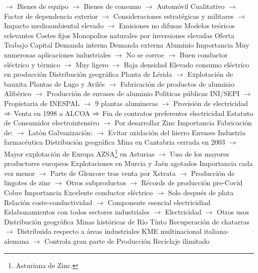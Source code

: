 \documentclass{nuevotema}
\begin{document}
\begin{esquemal}
				\4[] $\to$ Bienes de equipo
				\4[] $\to$ Bienes de consumo
				\4[] $\to$ Automóvil
				\4[] Cualitativo
				\4[] $\to$ Factor de dependencia exterior
				\4[] $\to$ Consideraciones estratégicas y militares
				\4[] $\to$ Impacto medioambiental elevado
				\4[] $\to$ Emisiones no difusas
				\4 Modelos teóricos relevantes
				\4[] Costes fijos
				\4[] Monopolios naturales por inversiones elevadas
				\4 Oferta
				\4[] Trabajo
				\4[] Capital
				\4 Demanda interna
				\4 Demanda externa
			\3 Aluminio
				\4 Importancia
				\4[] Muy numerosas aplicaciones industriales
				\4[] $\to$ No se corroe
				\4[] $\to$ Buen conductor eléctrico y térmico
				\4[] $\to$ Muy ligero
				\4[] $\to$ Baja densidad
				\4[] Elevado consumo eléctrico en producción
				\4 Distribución geográfica
				\4[] Planta de Lérida
				\4[] $\to$ Explotación de bauxita
				\4[] Plantas de Lugo y Avilés
				\4[] $\to$ Fabricación de productos de aluminio
				\4[] Alibérico
				\4[] $\to$ Producción de envases de aluminio
				\4 Políticas públicas
				\4[] INI/SEPI
				\4[] $\to$ Propietaria de INESPAL
				\4[] $\to$ 9 plantas alumineras
				\4[] $\to$ Provisión de electricidad
				\4[] $\Rightarrow$ Venta en 1998 a ALCOA
				\4[] $\Rightarrow$ Fin de contratos preferentes electricidad
				\4[] Estatuto de Consumidor electrointensivo
				\4[] $\to$ Por desarrollar
			\3 Zinc
				\4 Importancia
				\4[] Fabricación de:
				\4[] $\to$ Latón
				\4[] Galvanización:
				\4[] $\to$ Evitar oxidación del hierro
				\4[] Envases
				\4[] Industria farmacéutica
				\4 Distribución geográfica
				\4[] Mina en Cantabria cerrada en 2003
				\4[] $\to$ Mayor explotación de Europa
				\4[] AZSA\footnote{Asturiana de Zinc.} en Asturias
				\4[] $\to$ Uno de los mayores productores europeos
				\4[] Explotaciones en Murcia y Jaén agotados
				\4[] Importancia cada vez menor
				\4[] $\to$ Parte de Glencore tras venta por Xstrata
				\4[] $\to$ Producción de lingotes de zinc
				\4[] $\to$ Otros subproductos
				\4[] $\to$ Récords de producción pre-Covid
			\3 Cobre
				\4 Importancia
				\4[] Excelente conductor eléctrico
				\4[] $\to$ Solo después de plata
				\4[] Relación coste-conductividad
				\4[] $\to$ Componente esencial electricidiad
				\4[] Eslabonamientos con todos sectores industriales
				\4[] $\to$ Electricidad
				\4[] $\to$ Otros usos
				\4 Distribución geográfica
				\4[] Minas históricas de Río Tinto
				\4[] Recuperación de chatarras
				\4[] $\to$ Distribuida respecto a áreas industriales
				\4[] KME multinacional italiana-alemana
				\4[] $\to$ Controla gran parte de Producción
				\4 Reciclaje ilimitado

\end{esquemal}
\end{document}
